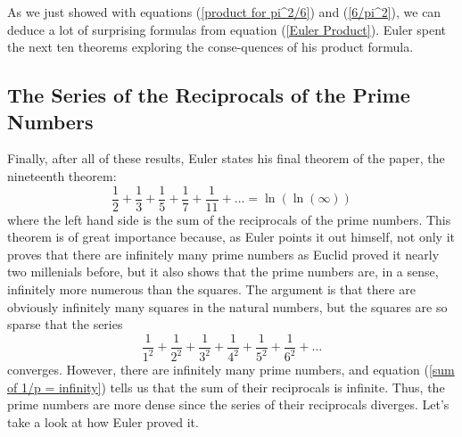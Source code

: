 As we just showed with equations (\ref{product for pi^2/6}) and (\ref{6/pi^2}), we can deduce a lot of surprising formulas from equation (\ref{Euler Product}). Euler spent the next ten theorems exploring the conse-quences of his product formula.

\subsection*{The Series of the Reciprocals of the Prime Numbers}
Finally, after all of these results, Euler states his final theorem of the paper, the nineteenth theorem: 
\begin{equation} \label{sum of 1/p = infinity}
    \boxed{\frac{1}{2} + \frac{1}{3} + \frac{1}{5} + \frac{1}{7} + \frac{1}{11} + \dots = \ln(\ln(\infty))}
\end{equation}
where the left hand side is the sum of the reciprocals of the prime numbers. This theorem is of great importance because, as Euler points it out himself, not only it proves that there are infinitely many prime numbers as Euclid proved it nearly two millenials before, but it also shows that the prime numbers are, in a sense, infinitely more numerous than the squares. The argument is that there are obviously infinitely many squares in the natural numbers, but the squares are so sparse that the series
$$\frac{1}{1^2} + \frac{1}{2^2} + \frac{1}{3^2} + \frac{1}{4^2} + \frac{1}{5^2} + \frac{1}{6^2} + \dots$$
converges. However, there are infinitely many prime numbers, and equation (\ref*{sum of 1/p = infinity}) tells us that the sum of their reciprocals is infinite. Thus, the prime numbers are more dense since the series of their reciprocals diverges. Let's take a look at how Euler proved it.

